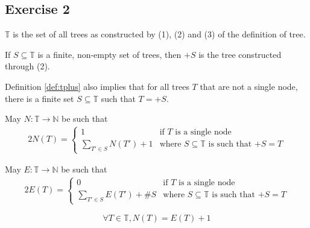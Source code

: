 \documentclass[docid=TP01]{tcom_TP}
\begin{document}
\subsection{Exercise 2}
\begin{definition}
	$\mathbb{T}$ is the set of all trees as constructed by (1), (2) and (3) of the definition of tree.
\end{definition}
\begin{definition}[Operator $+S$]
\label{def:tplus}
	If $S\subseteq\mathbb{T}$ is a finite, non-empty set of trees, then $+S$ is the tree constructed through (2).
\end{definition}
\begin{remark}
	Definition \ref{def:tplus} also implies that for all trees $T$ that are not a single node, there is a finite set $S\subseteq\mathbb{T}$ such that $T=+S$.
\end{remark}
\begin{definition}
	May $N\colon\mathbb{T}\rightarrow\mathbb{N}$ be such that
	\begin{alignat*}{2}
		N(T)= \begin{cases}
			  1                          & \text{if $T$ is a single node}\\
			  \sum_{T' \in S}{N(T')} + 1 & \text{where $S\subseteq\mathbb{T}$ is such that $+S=T$} 
			  \end{cases}
	\end{alignat*}
\end{definition}
\begin{definition}
	May $E\colon\mathbb{T}\rightarrow\mathbb{N}$ be such that
	\begin{alignat*}{2}
		E(T)= \begin{cases}
			  0                            & \text{if $T$ is a single node}\\
			  \sum_{T' \in S}{E(T')} + \#S & \text{where $S\subseteq\mathbb{T}$ is such that $+S=T$} 
			  \end{cases}
	\end{alignat*}
\end{definition}
\begin{theorem}
\begin{equation*}
\forall T \in \mathbb{T}, N(T)=E(T)+1
\end{equation*}
\end{theorem}
\end{document}
